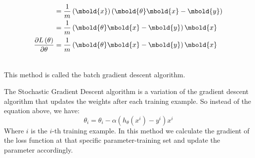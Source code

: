 \documentclass[12pt letter]{report}
\begin{document}
\begin{align*}
                                                                            & = \frac{1}{m} \left( \mbold{x} \right)  \left(
  \mbold{\theta} \mbold{x} - \mbold{y} \right)                                                                                                                                                                \\
                                                                            & = \frac{1}{m} \left( \mbold{\theta} \mbold{x} - \mbold{y}
  \right) \mbold{x}                                                                                                                                                                                           \\
  \frac{\partial L \left( \theta \right) }{\partial \theta}                 & = \frac{1}{m} \left( \mbold{\theta} \mbold{x} - \mbold{y}
  \right) \mbold{x}                                                                                                                                                                                           \\ \\
\end{align*}

This method is called the batch gradient descent algorithm.




The Stochastic Gradient Descent algorithm is a variation of the gradient descent algorithm that updates the weights
after each training example. So instead of the equation above, we have:
\[
  \theta_i = \theta_i - \alpha \left( h_{\theta} \left( x^i \right) - y^i \right) x^i
\]
Where $i$ is the $i$-th training example. In this method we calculate the gradient of the loss function at that
specific parameter-training set and update the parameter accordingly.
\end{document}

